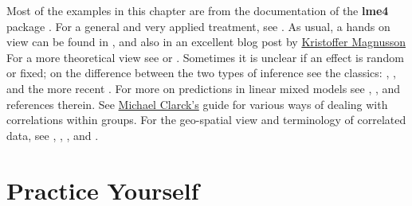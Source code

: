 \documentclass[]{book}
\theoremstyle{definition}
\theoremstyle{definition}
\theoremstyle{definition}
\theoremstyle{remark}
\begin{document}
Most of the examples in this chapter are from the documentation of the
\textbf{lme4} package \citep{lme4}. For a general and very applied
treatment, see \citet{pinero2000mixed}. As usual, a hands on view can be
found in \citet{venables2013modern}, and also in an excellent blog post
by
\href{http://rpsychologist.com/r-guide-longitudinal-lme-lmer}{Kristoffer
Magnusson} For a more theoretical view see \citet{weiss2005modeling} or
\citet{searle2009variance}. Sometimes it is unclear if an effect is
random or fixed; on the difference between the two types of inference
see the classics: \citet{eisenhart1947assumptions},
\citet{kempthorne1975fixed}, and the more recent
\citet{rosset2018fixed}. For more on predictions in linear mixed models
see \citet{robinson1991blup}, \citet{rabinowicz2018assessing}, and
references therein. See
\href{https://m-clark.github.io/docs/clustered/}{Michael Clarck's} guide
for various ways of dealing with correlations within groups. For the
geo-spatial view and terminology of correlated data, see
\citet{christakos2000modern}, \citet{diggle1998model},
\citet{allard2013j}, and \citet{cressie2015statistics}.

\section{Practice Yourself}\label{practice-yourself-4}
\end{document}
